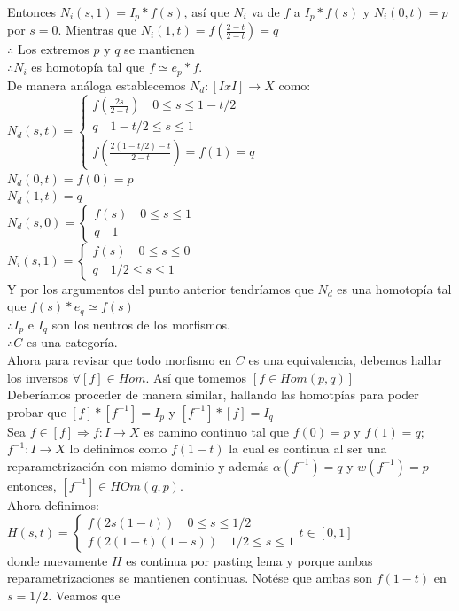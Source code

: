 \documentclass[11pt,a4paper,oneside]{report}
\theoremstyle{definition}
\theoremstyle{plain}
\theoremstyle{remark}
\begin{document}
Entonces $N_i(s,1)= I_p*f(s)$, así que $N_i$ va de $f$ a $I_p*f(s)$ y $N_i(0,t)=p$ por $s=0$. Mientras que $N_i(1,t)=f(\frac{2-t}{2-t})=q$\\
$\therefore$ Los extremos $p$ y $q$ se mantienen\\
$\therefore N_i$ es homotopía tal que $f\simeq e_p*f$. \\
De manera análoga establecemos $N_d:[IxI]\rightarrow X$
como:\\

$N_d(s,t) = \left\{
  \begin{array}{l}
    f(\frac{2s}{2-t}) \quad 0\leq s \leq 1- t/2 \\
    q \quad 1-t/2 \leq s \leq 1 \\
    f(\frac{2(1-t/2)-t}{2-t})=f(1)=q
  \end{array}
\right.$\\
$N_d(0,t)=f(0)=p$\\
$N_d(1,t)=q$\\

$N_d(s,0) = \left\{
  \begin{array}{l}
    f(s) \quad 0\leq s \leq 1  \\
    q \quad 1 
  \end{array}
\right.$\\

$N_i(s,1) = \left\{
  \begin{array}{l}
    f(s) \quad 0\leq s \leq 0  \\
    q \quad 1/2 \leq s \leq 1 
  \end{array}
\right.$\\
Y por los argumentos del punto anterior tendríamos que $N_d$ es una homotopía tal que $f(s)*e_q\simeq f(s)$\\
$\therefore I_p$ e $I_q$ son los neutros de los morfismos.\\
$\therefore C$ es una categoría.\\
Ahora para revisar que todo morfismo en $C$ es una equivalencia, debemos hallar los inversos $\forall [f] \in Hom$.
Así que tomemos $[f \in Hom(p,q)]$\\
Deberíamos proceder de manera similar, hallando las homotpías para poder probar que $[f]*[f^{-1}]=I_p$ y $[f^{-1}]*[f]=I_q$\\
Sea $f\in[f]\Rightarrow f:I\rightarrow X$ es camino continuo tal que $f(0)=p$ y $f(1)=q$; $f^{-1}:I\rightarrow X$ lo
definimos como $f(1-t)$ la cual es continua al ser una reparametrización con mismo dominio y además $\alpha(f^{-1})=q$
y $w(f^{-1})=p$ entonces, $[f^{-1}]\in HOm(q,p)$. \\
Ahora definimos:\\
$H(s,t) = \left\{
  \begin{array}{l}
    f(2s(1-t)) \quad 0\leq s \leq 1/2  \\
    f(2(1-t)(1-s)) \quad 1/2 \leq s \leq 1 
  \end{array}
  t \in [0,1]
\right.$\\
donde nuevamente $H$ es continua por pasting lema y porque ambas reparametrizaciones se mantienen continuas. Notése 
que ambas son $f(1-t)$ en $s=1/2$. Veamos que\\
\end{document}
